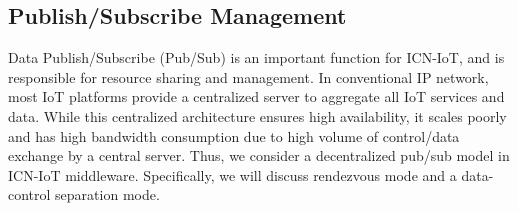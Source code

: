 

\subsection{Publish/Subscribe Management}
Data Publish/Subscribe (Pub/Sub) is an important function for ICN-IoT, and is responsible for resource sharing and management. In conventional IP network, most  IoT platforms provide a centralized server to aggregate all IoT services and data. While
this centralized architecture ensures high availability, it scales poorly and has high bandwidth consumption due to high volume of control/data exchange by a central server. Thus, we consider a decentralized pub/sub model in ICN-IoT middleware. Specifically, we will discuss rendezvous mode and a data-control separation mode.


